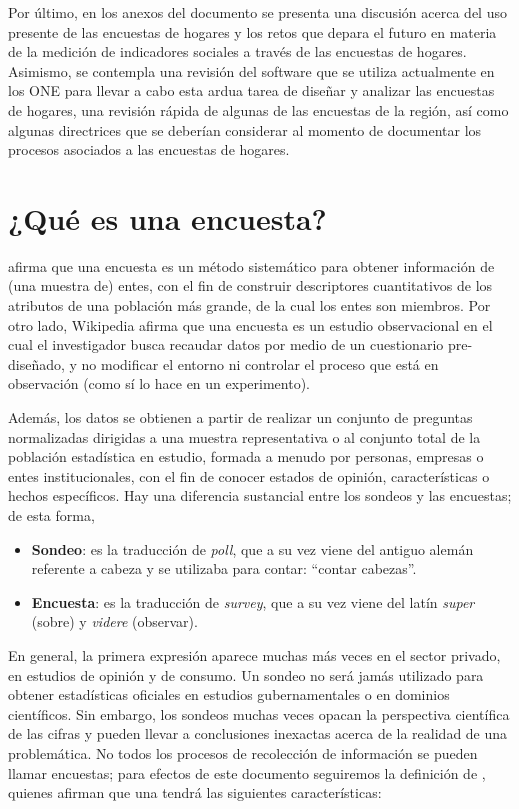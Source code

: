 \documentclass[
  12pt,
]{book}
\providecommand{\tightlist}{%
  \setlength{\itemsep}{0pt}\setlength{\parskip}{0pt}}
\begin{document}
Por último, en los anexos del documento se presenta una discusión acerca del uso presente de las encuestas de hogares y los retos que depara el futuro en materia de la medición de indicadores sociales a través de las encuestas de hogares. Asimismo, se contempla una revisión del software que se utiliza actualmente en los ONE para llevar a cabo esta ardua tarea de diseñar y analizar las encuestas de hogares, una revisión rápida de algunas de las encuestas de la región, así como algunas directrices que se deberían considerar al momento de documentar los procesos asociados a las encuestas de hogares.

\hypertarget{quuxe9-es-una-encuesta}{%
\section{¿Qué es una encuesta?}\label{quuxe9-es-una-encuesta}}

\citet{Groves_Fowler_Couper_Lepkowski_Singer_Tourangeau_2009} afirma que una encuesta es un método sistemático para obtener información de (una muestra de) entes, con el fin de construir descriptores cuantitativos de los atributos de una población más grande, de la cual los entes son miembros.
Por otro lado, Wikipedia afirma que una encuesta es un estudio observacional en el cual el investigador busca recaudar datos por medio de un cuestionario pre-diseñado, y no modificar el entorno ni controlar el proceso que está en observación (como sí lo hace en un experimento).

Además, los datos se obtienen a partir de realizar un conjunto de preguntas normalizadas dirigidas a una muestra representativa o al conjunto total de la población estadística en estudio, formada a menudo por personas, empresas o entes institucionales, con el fin de conocer estados de opinión, características o hechos específicos. Hay una diferencia sustancial entre los sondeos y las encuestas; de esta forma,

\begin{itemize}
\tightlist
\item
  \textbf{Sondeo}: es la traducción de \emph{poll}, que a su vez viene del antiguo alemán referente a cabeza y se utilizaba para contar: ``contar cabezas''.
\item
  \textbf{Encuesta}: es la traducción de \emph{survey}, que a su vez viene del latín \emph{super} (sobre) y \emph{videre} (observar).
\end{itemize}

En general, la primera expresión aparece muchas más veces en el sector privado, en estudios de opinión y de consumo. Un sondeo no será jamás utilizado para obtener estadísticas oficiales en estudios gubernamentales o en dominios científicos. Sin embargo, los sondeos muchas veces opacan la perspectiva científica de las cifras y pueden llevar a conclusiones inexactas acerca de la realidad de una problemática. No todos los procesos de recolección de información se pueden llamar encuestas; para efectos de este documento seguiremos la definición de \citet{Groves_Fowler_Couper_Lepkowski_Singer_Tourangeau_2009}, quienes afirman que una tendrá las siguientes características:
\end{document}

